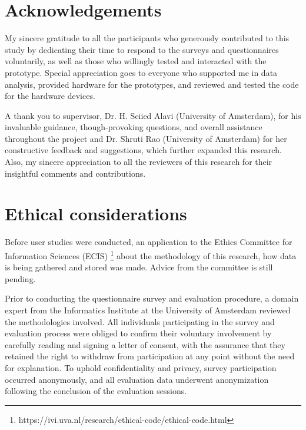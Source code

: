 \onecolumn

\appendix
\begin{appendices}

\section{Acknowledgements}
\label{sec:apx:first_appendix}

My sincere gratitude to all the participants who generously contributed to this study by dedicating their time to respond to the surveys and questionnaires voluntarily, as well as those who willingly tested and interacted with the prototype. Special appreciation goes to everyone who supported me in data analysis, provided hardware for the prototypes, and reviewed and tested the code for the hardware devices.

A thank you to supervisor, Dr. H. Seiied Alavi (University of Amsterdam), for his invaluable guidance, though-provoking questions, and overall assistance throughout the project and Dr. Shruti Rao (University of Amsterdam) for her constructive feedback and suggestions, which further expanded this research. Also, my sincere appreciation to all the reviewers of this research for their insightful comments and contributions.

\section{Ethical considerations}
\label{sec:apx:first_appendix}

Before user studies were conducted, an application to the Ethics Committee for Information Sciences (ECIS) \footnote{https://ivi.uva.nl/research/ethical-code/ethical-code.html} about the methodology of this research, how data is being gathered and stored was made. Advice from the committee is still pending.

Prior to conducting the questionnaire survey and evaluation procedure, a domain expert from the Informatics Institute at the University of Amsterdam reviewed the methodologies involved. All individuals participating in the survey and evaluation process were obliged to confirm their voluntary involvement by carefully reading and signing a letter of consent, with the assurance that they retained the right to withdraw from participation at any point without the need for explanation. To uphold confidentiality and privacy, survey participation occurred anonymously, and all evaluation data underwent anonymization following the conclusion of the evaluation sessions.


\end{appendices}
